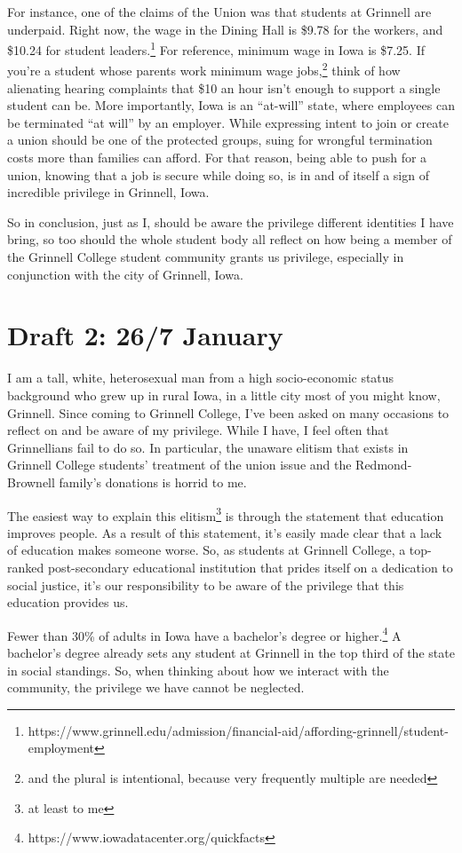 \documentclass[12pt]{article}[titlepage]
\newcommand{\say}[1]{``#1''}
\newcommand{\1}{\={a}}
\newcommand{\2}{\={e}}
\newcommand{\3}{\={\i}}
\newcommand{\4}{\=o}
\newcommand{\5}{\=u}
\newcommand{\6}{\={A}}
\renewcommand{\,}{\textsuperscript{,}}
\begin{document}
For instance, one of the claims of the Union was that students at Grinnell are underpaid.
Right now, the wage in the Dining Hall is \$9.78 for the workers, and \$10.24 for student leaders.\footnote{https://www.grinnell.edu/admission/financial-aid/affording-grinnell/student-employment}
For reference, minimum wage in Iowa is \$7.25.
If you're a student whose parents work minimum wage jobs,\footnote{and the plural is intentional, because very frequently multiple are needed} think of how alienating hearing complaints that \$10 an hour isn't enough to support a single student can be.
More importantly, Iowa is an \say{at-will} state, where employees can be terminated \say{at will} by an employer.
While expressing intent to join or create a union should be one of the protected groups, suing for wrongful termination costs more than families can afford.
For that reason, being able to push for a union, knowing that a job is secure while doing so, is in and of itself a sign of incredible privilege in Grinnell, Iowa.

So in conclusion, just as I, should be aware the privilege different identities I have bring, so too should the whole student body all reflect on how being a member of the Grinnell College student community grants us privilege, especially in conjunction with the city of Grinnell, Iowa.
\section{Draft 2: 26/7 January}
I am a tall, white, heterosexual man from a high socio-economic status background who grew up in rural Iowa, in a little city most of you might know, Grinnell.
Since coming to Grinnell College, I've been asked on many occasions to reflect on and be aware of my privilege.
While I have, I feel often that Grinnellians fail to do so.
In particular, the unaware elitism that exists in Grinnell College students' treatment of the union issue and the Redmond-Brownell family's donations is horrid to me.

The easiest way to explain this elitism\footnote{at least to me} is through the statement that education improves people.
As a result of this statement, it's easily made clear that a lack of education makes someone worse.
So, as students at Grinnell College, a top-ranked post-secondary educational institution that prides itself on a dedication to social justice, it's our responsibility to be aware of the privilege that this education provides us.

Fewer than 30\% of adults in Iowa have a bachelor's degree or higher.\footnote{https://www.iowadatacenter.org/quickfacts}
A bachelor's degree already sets any student at Grinnell in the top third of the state in social standings.
So, when thinking about how we interact with the community, the privilege we have cannot be neglected.
\end{document}
